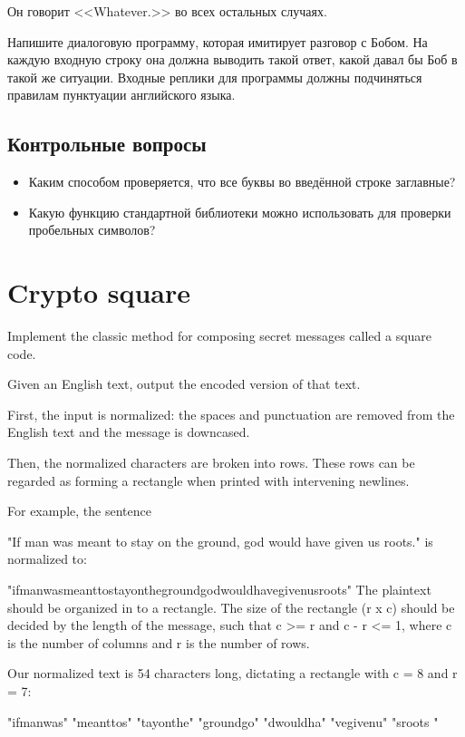 \documentclass[10pt,twoside,openany]{book}
\begin{document}
Он говорит <<Whatever.>> во всех остальных случаях.

Напишите диалоговую программу, которая имитирует разговор с Бобом. На каждую входную строку она
должна выводить такой ответ, какой давал бы Боб в такой же ситуации. Входные реплики для программы
должны подчиняться правилам пунктуации английского языка.

\subsection*{Контрольные вопросы}

\begin{itemize}
    \item Каким способом проверяется, что все буквы во введённой строке заглавные?
    \item Какую функцию стандартной библиотеки можно использовать для проверки пробельных символов?
\end{itemize}

\section{Crypto square}

Implement the classic method for composing secret messages called a square code.

Given an English text, output the encoded version of that text.

First, the input is normalized: the spaces and punctuation are removed from the English text and the message is downcased.

Then, the normalized characters are broken into rows. These rows can be regarded as forming a rectangle when printed with intervening newlines.

For example, the sentence

"If man was meant to stay on the ground, god would have given us roots."
is normalized to:

"ifmanwasmeanttostayonthegroundgodwouldhavegivenusroots"
The plaintext should be organized in to a rectangle. The size of the rectangle (r x c) should be decided by the length of the message, such that c >= r and c - r <= 1, where c is the number of columns and r is the number of rows.

Our normalized text is 54 characters long, dictating a rectangle with c = 8 and r = 7:

"ifmanwas"
"meanttos"
"tayonthe"
"groundgo"
"dwouldha"
"vegivenu"
"sroots  "
\end{document}
